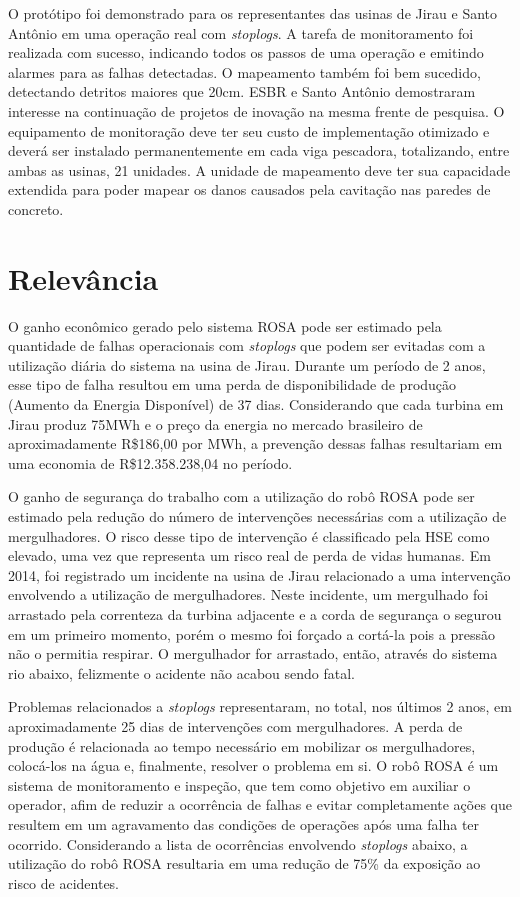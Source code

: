 O protótipo foi demonstrado para os representantes das usinas de Jirau e Santo
Antônio em uma operação real com \textit{stoplogs}. A tarefa de monitoramento
foi realizada com sucesso, indicando todos os passos de uma operação e emitindo
alarmes para as falhas detectadas. O mapeamento também foi bem sucedido,
detectando detritos maiores que 20cm. ESBR e Santo Antônio demostraram interesse
na continuação de projetos de inovação na mesma frente de pesquisa. O
equipamento de monitoração deve ter seu custo de implementação otimizado e
deverá ser instalado permanentemente em cada viga pescadora, totalizando, entre
ambas as usinas, 21 unidades. A unidade de mapeamento deve ter sua capacidade
extendida para poder mapear os danos causados pela cavitação nas paredes de
concreto.

\section{Relevância}

O ganho econômico gerado pelo sistema ROSA pode ser estimado pela quantidade de
falhas operacionais com \textit{stoplogs} que podem ser evitadas com a
utilização diária do sistema na usina de Jirau. Durante um período de 2 anos,
esse tipo de falha resultou em uma perda de disponibilidade de produção (Aumento
da Energia Disponível) de 37 dias. Considerando que cada turbina em Jirau produz
75MWh e o preço da energia no mercado brasileiro de aproximadamente R\$186,00 por MWh, a prevenção 
dessas falhas resultariam em uma economia de R\$12.358.238,04 no período.

O ganho de segurança do trabalho com a utilização do robô ROSA pode ser estimado
pela redução do número de intervenções necessárias com a utilização de
mergulhadores. O risco desse tipo de intervenção é classificado pela HSE como
elevado, uma vez que representa um risco real de perda de vidas humanas. Em
2014, foi registrado um incidente na usina de Jirau relacionado a uma
intervenção envolvendo a utilização de mergulhadores. Neste incidente, um
mergulhado foi arrastado pela correnteza da turbina adjacente e a corda de
segurança o segurou em um primeiro momento, porém o mesmo foi forçado a cortá-la
pois a pressão não o permitia respirar. O mergulhador for arrastado, então,
através do sistema rio abaixo, felizmente o acidente não acabou sendo fatal.

Problemas relacionados a \textit{stoplogs} representaram, no total, nos últimos
2 anos, em aproximadamente 25 dias de intervenções com mergulhadores. A perda de
produção é relacionada ao tempo necessário em mobilizar os mergulhadores,
colocá-los na água e, finalmente, resolver o problema em si. O robô ROSA é um
sistema de monitoramento e inspeção, que tem como objetivo em auxiliar o
operador, afim de reduzir a ocorrência de falhas e evitar completamente ações
que resultem em um agravamento das condições de operações após uma falha ter
ocorrido. Considerando a lista de ocorrências envolvendo \textit{stoplogs}
abaixo, a utilização do robô ROSA resultaria em uma redução de 75\% da
exposição ao risco de acidentes.

